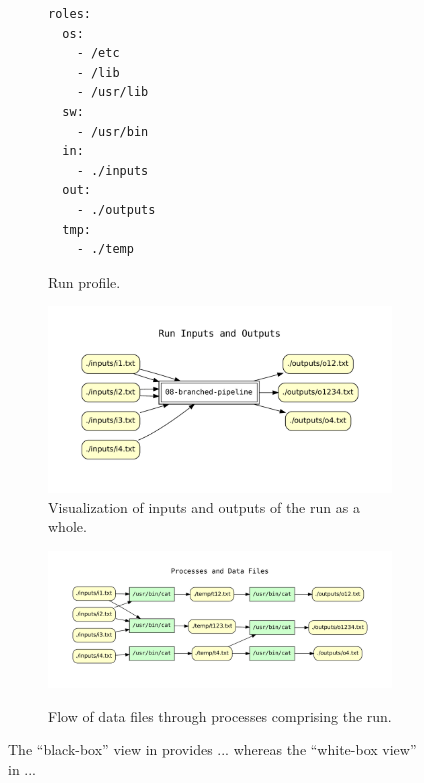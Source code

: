 \begin{figure}[th]
        \centering         
\begin{subfigure}[c]{0.18\linewidth}
\begin{verbatim}
roles:
  os:
    - /etc
    - /lib
    - /usr/lib
  sw:
    - /usr/bin
  in:
    - ./inputs
  out:
    - ./outputs
  tmp:
    - ./temp
\end{verbatim}
  \vspace*{-1em}
            \caption{Run profile.}
        \end{subfigure}
\hfill
        \begin{subfigure}[c]{0.69\linewidth}
          \centering
            \includegraphics[width=0.92\linewidth]{cpr_run_inputs_outputs.pdf}
            \caption{Visualization of inputs and outputs of the run as a whole.}
            \label{subfig-blackbox}
        \end{subfigure} 

\medskip

\centering 
\begin{subfigure}[b]{0.9\linewidth}
        {\includegraphics[width=1.0\linewidth]{cpr_processes_and_data_files.pdf}}
        \caption{Flow of data files through processes comprising the run.}
        \label{subfig-whitebox}
    \end{subfigure}
\caption{The ``black-box'' view in  provides ... whereas the ``white-box view'' in  ...}
\label{fig-cpr-example}
\end{figure}





